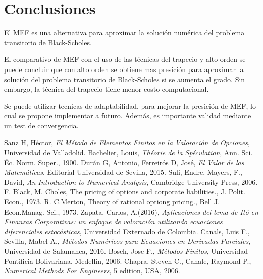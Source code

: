 \documentclass[12pt]{article}
\begin{document}
\section{Conclusiones}
El MEF es una alternativa para aproximar la solución numérica del problema transitorio de Black-Scholes.

El comparativo de MEF con el uso de las técnicas del trapecio y alto orden se puede concluir que con alto orden se obtiene mas presición para aproximar la solución del problema transitorio de Black-Scholes si se aumenta el grado. Sin embargo, la técnica del trapecio tiene menor costo computacional.

Se puede utilizar tecnicas de adaptabilidad, para mejorar la presición de MEF, lo cual se propone implementar a futuro. Además, es importante validad mediante un test de convergencia.
\onecolumn

\begin{thebibliography}{20}
	 Sanz H, Héctor, \textit{El Método de Elementos Finitos en la Valoración de Opciones}, Universidad de Valladolid.
	Bachelier, Louis, \textit{Théorie de la Spéculation}, Ann. Sci. Éc. Norm. Super., 1900.
	Durán G, Antonio, Ferreirós D, José, \textit{El Valor de las Matemáticas}, Editorial Universidad de Sevilla, 2015.
	 Suli, Endre, Mayers, F., David, \textit{An Introduction to Numerical Analysis}, Cambridge University Press, 2006.
	 F. Black, M. Choles, The pricing of options and corporate liabilities., J. Polit. Econ., 1973.
	 R. C.Merton, Theory of rational optiong pricing., Bell J. Econ.Manag. Sci., 1973.
	 Zapata, Carlos, A.(2016), \textit{Aplicaciones del lema de Itó en Finanzas Corporativas: un enfoque de valoración utilizando ecuaciones diferenciales estocásticas}, Universidad Externado de Colombia.
	 Canals, Luis F., Sevilla, Mabel A., \textit{Métodos Numéricos para Ecuaciones en Derivadas Parciales}, Universidad de Salamanca, 2016.
	 Bosch, Jose F., \textit{Métodos Finitos}, Universidad Pontificia Bolivariana, Medellin, 2006.
	 Chapra, Steven C., Canale, Raymond P., \textit{Numerical Methods For Engineers}, 5 edition,  USA, 2006.\\[1cm]
\end{thebibliography}
\end{document}
